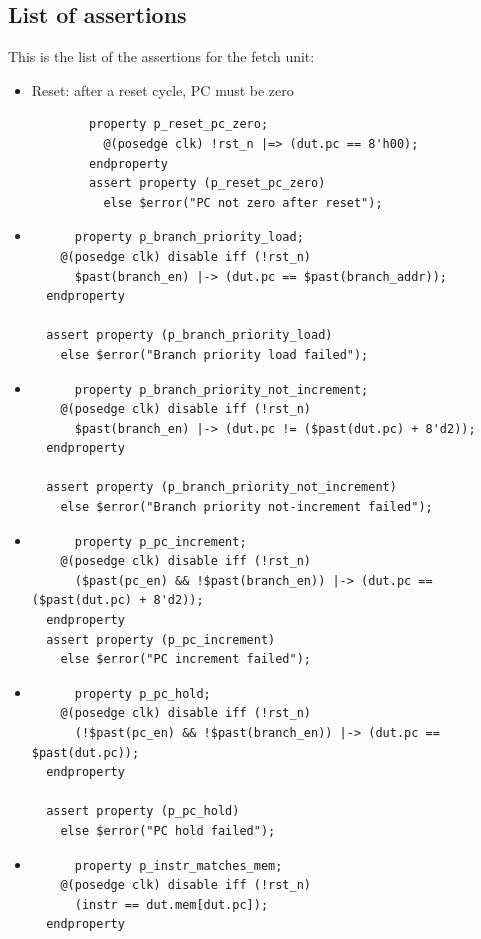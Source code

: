 \documentclass{article}
\begin{document}
\subsection{List of assertions}
This is the list of the assertions for the fetch unit: 
\begin{itemize}
    \item Reset: after a reset cycle, PC must be zero
    \begin{verbatim}
        property p_reset_pc_zero;
          @(posedge clk) !rst_n |=> (dut.pc == 8'h00);
        endproperty
        assert property (p_reset_pc_zero)
          else $error("PC not zero after reset");
    \end{verbatim}
    \item \begin{verbatim}
      property p_branch_priority_load;
    @(posedge clk) disable iff (!rst_n)
      $past(branch_en) |-> (dut.pc == $past(branch_addr));
  endproperty

  assert property (p_branch_priority_load)
    else $error("Branch priority load failed");
    \end{verbatim}
    \item \begin{verbatim}
      property p_branch_priority_not_increment;
    @(posedge clk) disable iff (!rst_n)
      $past(branch_en) |-> (dut.pc != ($past(dut.pc) + 8'd2));
  endproperty

  assert property (p_branch_priority_not_increment)
    else $error("Branch priority not-increment failed");
    \end{verbatim}
    \item \begin{verbatim}
      property p_pc_increment;
    @(posedge clk) disable iff (!rst_n)
      ($past(pc_en) && !$past(branch_en)) |-> (dut.pc == ($past(dut.pc) + 8'd2));
  endproperty
  assert property (p_pc_increment)
    else $error("PC increment failed");
    \end{verbatim}
    \item \begin{verbatim}
      property p_pc_hold;
    @(posedge clk) disable iff (!rst_n)
      (!$past(pc_en) && !$past(branch_en)) |-> (dut.pc == $past(dut.pc));
  endproperty

  assert property (p_pc_hold)
    else $error("PC hold failed");
    \end{verbatim}
    \item \begin{verbatim}
      property p_instr_matches_mem;
    @(posedge clk) disable iff (!rst_n)
      (instr == dut.mem[dut.pc]);
  endproperty


\end{verbatim}
\end{itemize}
\end{document}
